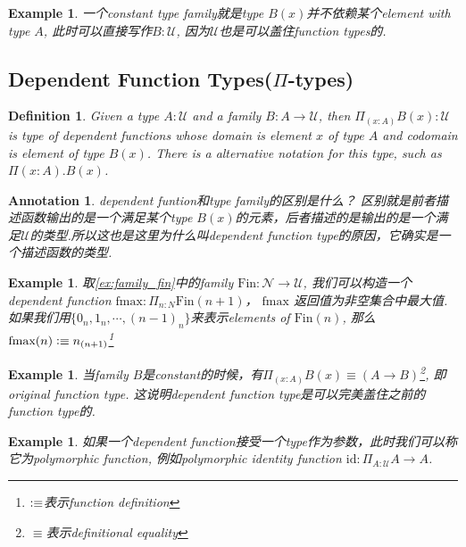 \documentclass{article}
\newtheorem{example}[theorem]{Example}
\newtheorem{definition}[theorem]{Definition}
\newtheorem{annotation}[theorem]{Annotation}
\newcommand{\defeqv}{\vcentcolon\equiv}
\begin{document}
\begin{example}
\rm 一个constant type family就是type $B(x)$并不依赖某个element with type $A$, 此时可以直接写作$B:\mathcal{U}$, 因为$\mathcal{U}$也是可以盖住function types的. 
\end{example}

\subsection{Dependent Function Types(\texorpdfstring{$\Pi$}{pi}-types)}


\begin{definition}
\rm Given a type $A:\mathcal{U}$ and a family $B:A \to \mathcal{U}$, then $\Pi_{(x:A)} B(x):\mathcal{U}$ is type of dependent functions whose domain is element $x$ of type $A$ and  codomain is element of type $B(x)$. There is a alternative notation for this type, such as $\Pi(x : A).B(x)$.
\end{definition}

\begin{annotation}
\rm dependent funtion和type family的区别是什么？ 区别就是前者描述函数输出的是一个满足某个type $B(x)$的元素，后者描述的是输出的是一个满足$\mathcal{U}$的类型.所以这也是这里为什么叫dependent function type的原因，它确实是一个描述函数的类型.
\end{annotation}


\begin{example}
\rm 取\ref{ex:family_fin}中的family $\text{Fin}:\mathcal{N} \to \mathcal{U}$, 我们可以构造一个dependent function $\text{fmax}:\Pi_{n : N} \text{Fin}(n+1)$， $\text{fmax}$
返回值为非空集合中最大值. 如果我们用$\{0_{n}, 1_{n}, \cdots, (n-1)_n\}$来表示elements of $\text{Fin}(n)$, 那么$\text{fmax}(n) \defeqv n_{(n+1)}$\footnote{$\defeqv$表示function definition} 
\end{example}

\begin{example}
\rm 当family $B$是constant的时候，有$\Pi_{(x:A)} B(x) \equiv (A \to B)$\footnote{$\equiv$表示definitional equality}, 即original function type. 这说明dependent function type是可以完美盖住之前的function type的.
\end{example}

\begin{example}
\rm 如果一个dependent function接受一个type作为参数，此时我们可以称它为polymorphic function, 例如polymorphic identity function $\text{id}:\Pi_{A:\mathcal{U}} A \to A$.
\end{example}
\end{document}
